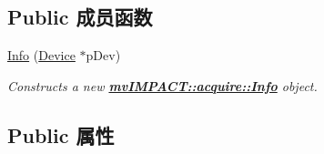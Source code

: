 \subsection*{Public 成员函数}
\begin{DoxyCompactItemize}
\item 
\hyperlink{classmv_i_m_p_a_c_t_1_1acquire_1_1_info_acd283bf5ade401d68a7ea075432e32a4}{Info} (\hyperlink{classmv_i_m_p_a_c_t_1_1acquire_1_1_device}{Device} $\ast$p\+Dev)
\begin{DoxyCompactList}\small\item\em Constructs a new {\bfseries \hyperlink{classmv_i_m_p_a_c_t_1_1acquire_1_1_info}{mv\+I\+M\+P\+A\+C\+T\+::acquire\+::\+Info}} object. \end{DoxyCompactList}\end{DoxyCompactItemize}
\subsection*{Public 属性}
